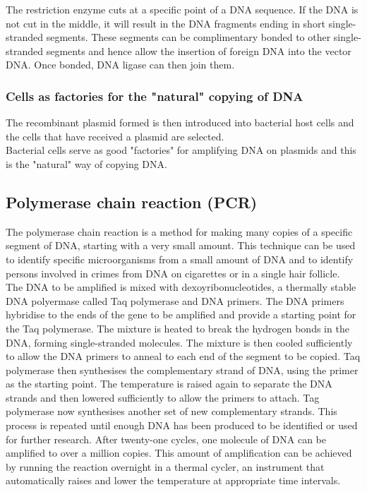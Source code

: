 \documentclass[11pt]{article}
\begin{document}
The restriction enzyme cuts at a specific point of a DNA sequence. If the DNA is not cut in the middle, it will result in the DNA fragments ending in short single-stranded segments. These segments can be complimentary bonded to other single-stranded segments and hence allow the insertion of foreign DNA into the vector DNA. Once bonded, DNA ligase can then join them.

\subsubsection{Cells as factories for the "natural" copying of DNA}
\label{sec:orgfaceb54}
The recombinant plasmid formed is then introduced into bacterial host cells and the cells that have received a plasmid are selected.
\\[0pt]

Bacterial cells serve as good "factories" for amplifying DNA on plasmids and this is the "natural" way of copying DNA.

\newpage

\subsection{Polymerase chain reaction (PCR)}
\label{sec:orgb677930}
The polymerase chain reaction is a method for making many copies of a specific segment of DNA, starting with a very small amount. This technique can be used to identify specific microorganisms from a small amount of DNA and to identify persons involved in crimes from DNA on cigarettes or in a single hair follicle.
\\[0pt]

The DNA to be amplified is mixed with dexoyribonucleotides, a thermally stable DNA polyermase called Taq polymerase and DNA primers. The DNA primers hybridise to the ends of the gene to be amplified and provide a starting point for the Taq polymerase. The mixture is heated to break the hydrogen bonds in the DNA, forming single-stranded molecules. The mixture is then cooled sufficiently to allow the DNA primers to anneal to each end of the segment to be copied. Taq polymerase then synthesises the complementary strand of DNA, using the primer as the starting point. The temperature is raised again to separate the DNA strands and then lowered sufficiently to allow the primers to attach. Tag polymerase now synthesises another set of new complementary strands. This process is repeated until enough DNA has been produced to be identified or used for further research. After twenty-one cycles, one molecule of DNA can be amplified to over a million copies. This amount of amplification can be achieved by running the reaction overnight in a thermal cycler, an instrument that automatically raises and lower the temperature at appropriate time intervals.
\end{document}
